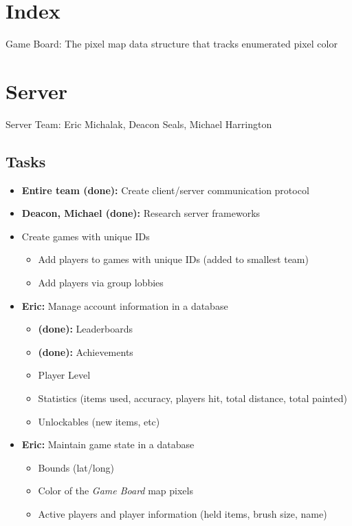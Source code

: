 \documentclass[oneside,12pt]{scrbook}
\begin{document}


\tableofcontents
\clearpage
\chapter{Index}
Game Board: The pixel map data structure that tracks enumerated pixel color

\chapter{Server}
Server Team: Eric Michalak, Deacon Seals, Michael Harrington

\section{Tasks}
\begin{itemize}
    \item \textbf{Entire team (done):} Create client/server communication protocol
    \item \textbf{Deacon, Michael (done):} Research server frameworks
    \item Create games with unique IDs
        \begin{itemize}
            \item Add players to games with unique IDs (added to smallest team)
            \item Add players via group lobbies
        \end{itemize}
    \item \textbf{Eric:} Manage account information in a database
        \begin{itemize}
            \item \textbf{(done):} Leaderboards
            \item \textbf{(done):} Achievements
            \item Player Level
            \item Statistics (items used, accuracy, players hit, total distance, total painted)
            \item Unlockables (new items, etc)
        \end{itemize}
    \item \textbf{Eric:} Maintain game state in a database
        \begin{itemize}
            \item Bounds (lat/long)
            \item Color of the \emph{Game Board} map pixels
            \item Active players and player information (held items, brush size, name)

\end{itemize}
\end{itemize}
\end{document}
